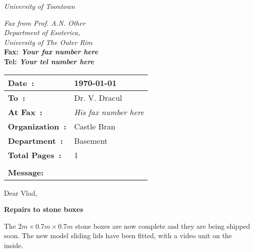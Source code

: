\documentclass[12pt]{article}
\begin{document}
\begin{center}
{\Huge\it University of Toontown}
\end{center}
\begin{flushleft}
{\large\it Fax from Prof. A.N. Other}\\
{\large\it Department of Esoterica,}\\
{\large\it University of The Outer Rim} \\
{\large\bf Fax: {\em Your fax number here} }\\
{\large\bf Tel: {\em Your tel number here}}\\
\end{flushleft}
\begin{tabular}{ll}
{\large\bf Date\ :}&\today \\
\hline
{\large\bf To\ : }&    Dr. V. Dracul\\
\hline
{\large\bf At Fax\ :}& {\em His fax number here}  \\
\hline
{\large\bf Organization\ :}& Castle Bran \\
\hline
{\large\bf Department\ :}&  Basement   \\
\hline
{\large\bf Total Pages\ :}&  1 \\
\hline \\
{\large\bf  Message:}
\end{tabular}

\noindent Dear Vlad,
\begin{center}
{\large\bf   Repairs to stone boxes   }
\end{center}

The $2m\times 0.7m\times 0.7m$ stone boxes are now complete and they are being shipped soon. The new model sliding lids have been fitted, with a video unit
on the inside.



 
\end{document}
